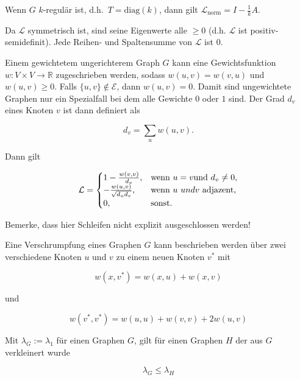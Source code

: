 Wenn $G$ $k$-regulär ist, d.h.\ $T = \text{diag}(k)$, dann gilt $\mathcal{L}_{\text{norm}} = I - \frac{1}{k}A$.

Da $\mathcal{L}$ symmetrisch ist, sind seine Eigenwerte alle $\geq 0$ (d.h. $\mathcal{L}$ ist positiv-semidefinit).
Jede Reihen- und Spaltensumme von $\mathcal{L}$ ist $0$.

Einem gewichtetem ungerichterem Graph $G$ kann eine Gewichtsfunktion $w: V \times V \rightarrow \mathbb{R}$ zugeschrieben werden, sodass $w(u, v) = w(v, u)$ und $w(u, v) \geq 0$.
Falls $\lbrace u, v \rbrace \notin \mathcal{E}$, dann $w(u, v) = 0$.
Damit sind ungewichtete Graphen nur ein Spezialfall bei dem alle Gewichte $0$ oder $1$ sind.
Der Grad $d_v$ eines Knoten $v$ ist dann definiert als

\begin{equation}
  d_v = \sum_u w(u, v).
\end{equation}

Dann gilt

\begin{equation}
  \mathcal{L} = \begin{cases}
    1 - \frac{w(v, v)}{d_v}, & \text{wenn }u = v\text{und }d_v \neq 0\text{,}\\
    -\frac{w(u,v)}{\sqrt{d_u d_v}}, & \text{wenn }u\text\ {und }v\ \text{adjazent,}\\
    0, & \text{sonst.}
  \end{cases}
\end{equation}

Bemerke, dass hier Schleifen nicht explizit ausgeschlossen werden!

Eine Verschrumpfung eines Graphen $G$ kann beschrieben werden über zwei verschiedene Knoten $u$ und $v$ zu einem neuen Knoten $v^*$ mit

\begin{equation}
  w(x,v^*) = w(x, u) + w(x, v)
\end{equation}

und

\begin{equation}
  w(v^*, v^*) = w(u, u) + w(v, v) + 2w(u,v)
\end{equation}

Mit $\lambda_G := \lambda_1$ für einen Graphen $G$, gilt für einen Graphen $H$ der aus $G$ verkleinert wurde

\begin{equation}
  \lambda_G \leq \lambda_H
\end{equation}

